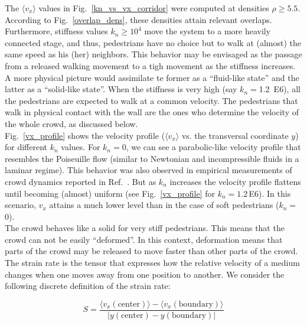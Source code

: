 \documentclass[preprint,12pt]{elsarticle}
\begin{document}
The $\langle v_x\rangle$ values in Fig.~\ref{kn_vs_vx_corridor} 
were computed at densities $\rho\geq 5.5$. According to 
Fig.~\ref{overlap_dens}, these densities attain relevant overlaps. Furthermore, 
stiffness values $k_n\geq 10^4$ move the system to a more heavily connected 
stage, and thus, pedestrians have no choice but to walk at 
(almost) the same speed as his (her) neighbors. This 
behavior may be envisaged as the passage from a released 
walking movement to a tigh movement as the stiffness increases. A more 
physical picture would assimilate te former as a ``fluid-like 
state'' and the latter as a ``solid-like state''. When the stiffness is 
very high (say $k_n=$1.2~E6), all the pedestrians 
are expected to walk at a common velocity. The 
pedestrians that walk in physical contact with the wall are the ones who 
determine the velocity of the whole crowd, as discussed 
below.\\

Fig.~\ref{vx_profile} shows the velocity profile ($\langle v_x \rangle$ vs. the transversal coordinate $y$) for different $k_n$ values. For $k_n=0$, we can see a parabolic-like velocity profile that resembles the Poiseuille flow (similar to Newtonian and incompressible fluids in a laminar regime). This behavior was also observed in empirical measurements of crowd dynamics reported in Ref.~\cite{zhang2013empirical}. But as $k_n$ increases the velocity profile flattens until becoming (almost) uniform (see Fig.~\ref{vx_profile} for $k_n=1.2\,$E6). In this scenario, $v_x$ attains a much lower level than in the case of soft pedestrians ($k_n=$0).\\

The crowd behaves like a solid for very stiff pedestrians. This means that the crowd can not be easily ``deformed''. In this context, deformation means that parts of the crowd may be released to move faster than other parts of the crowd. \\

The strain rate is the tensor that expresses how the relative velocity of a medium changes when one moves away from one position to another. We consider the following discrete definition of the strain rate:

\begin{equation}
S = \frac{\langle v_x(\mathrm{center})\rangle - \langle v_x(\mathrm{boundary})\rangle }{\left | y(\mathrm{center}) - y(\mathrm{boundary}) \right |} 
\end{equation}
\end{document}
